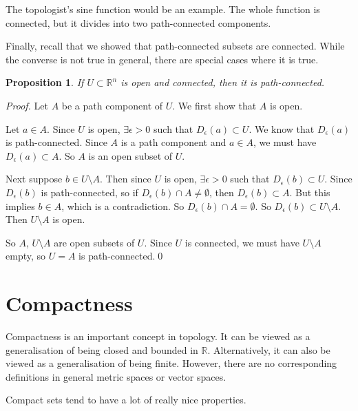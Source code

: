 \documentclass{article}
\theoremstyle{plain}\theoremheaderfont{\normalfont\itshape}\theorembodyfont{\rmfamily}\theoremseparator{.}\newtheorem*{rem}{Remark}\newtheorem*{ex}{Example}\newtheorem*{proof}{Proof}\newtheorem*{altp}{Alternative proof}
\theoremstyle{plain}\theoremheaderfont{\normalfont\bfseries}\theorembodyfont{\rmfamily}\theoremseparator{.}\newtheorem{thm}{Theorem}[section]\newtheorem{lem}[thm]{Lemma}\newtheorem{prop}[thm]{Proposition}\newtheorem*{cor}{Corollary}\newtheorem{defn}[thm]{Definition}\newtheorem{clm}[thm]{Claim}\newtheorem{clminproof}{Claim}
\theoremstyle{break}\theoremheaderfont{\normalfont\itshape}\theorembodyfont{\rmfamily}\theoremseparator{.\medskip}\newtheorem*{proofskip}{Proof}\newtheorem*{exs}{Examples}\newtheorem*{rems}{Remarks}
\theoremstyle{break}\theoremheaderfont{\normalfont\bfseries}\theorembodyfont{\rmfamily}\theoremseparator{.\medskip}\newtheorem{lemskip}[thm]{Lemma}\newtheorem{defnskip}[thm]{Definition}\newtheorem{propskip}[thm]{Proposition}\newtheorem{thmskip}[thm]{Theorem}
\newcommand{\qed}{\hfill\ensuremath{\Box}}
\begin{document}
    The topologist's sine function would be an example. The whole function is connected, but it divides into two path-connected components.

    Finally, recall that we showed that path-connected subsets are connected. While the converse is not true in general, there are special cases where it is true.

    \begin{prop}
        If \(U\subset\mathbb{R}^n\) is open and connected, then it is path-connected.
    \end{prop}
    \begin{proof}
        Let \(A\) be a path component of \(U\). We first show that \(A\) is open.

        Let \(a\in A\). Since \(U\) is open, \(\exists\epsilon>0\) such that \(D_\epsilon(a)\subset U\). We know that \(D_\epsilon(a)\) is path-connected. Since \(A\) is a path component and \(a\in A\), we must have \(D_\epsilon(a)\subset A\). So \(A\) is an open subset of \(U\).

        Next suppose \(b\in U\setminus A\). Then since \(U\) is open, \(\exists\epsilon>0\) such that \(D_\epsilon(b)\subset U\). Since \(D_\epsilon(b)\) is path-connected, so if \(D_\epsilon(b)\cap A\ne\emptyset\), then \(D_\epsilon(b)\subset A\). But this implies \(b\in A\), which is a contradiction. So \(D_\epsilon(b)\cap A=\emptyset\). So \(D_\epsilon(b)\subset U\setminus A\). Then \(U\setminus A\) is open.

        So \(A\), \(U\setminus A\) are open subsets of \(U\). Since \(U\) is connected, we must have \(U\setminus A\) empty, so \(U=A\) is path-connected.\qed
    \end{proof}

    \newpage
    \section{Compactness}
    Compactness is an important concept in topology. It can be viewed as a generalisation of being closed and bounded in \(\mathbb{R}\). Alternatively, it can also be viewed as a generalisation of being finite.
    However, there are no corresponding definitions in general metric spaces or vector spaces.
    
    Compact sets tend to have a lot of really nice properties.
\end{document}
